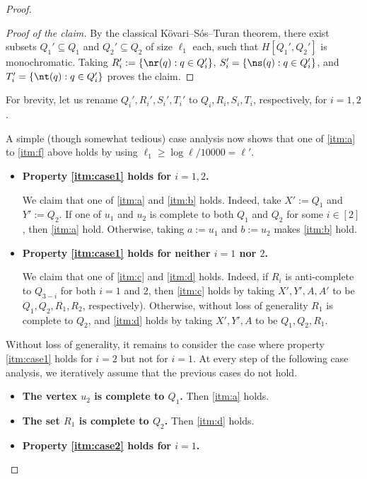 \documentclass[11pt,english]{article}
\theoremstyle{plain}
\theoremstyle{definition}
\theoremstyle{remark}
\begin{document}
\begin{proof}
\begin{proof}[Proof of the claim]
            By the classical K\"ovari--S\'os--Turan theorem, there exist subsets $Q_1' \subseteq Q_1$ and $Q_2' \subseteq Q_2$ of size $\ell_1$ each, such that $H[Q_1', Q_2']$ is monochromatic. Taking $R_i' := \{\nr(q) : q \in Q_i'\}$, $S_i'=\{\ns(q) : q \in Q_i'\}$, and $T_i'=\{\nt(q) : q \in Q_i'\}$ proves the claim.
        \end{proof}
        
        For brevity, let us rename $Q_i', R_i', S_i', T_i'$ to $Q_i, R_i, S_i, T_i$, respectively, for $i=1,2$.
        
        A simple (though somewhat tedious) case analysis now shows that one of \ref{itm:a} to \ref{itm:f} above holds by using $\ell_1 \ge \log \ell / 10000 = \ell'$. 
        \begin{itemize}
            \item
                {\bf Property \ref{itm:case1} holds for $i =1,2$.}
                
                We claim that one of \ref{itm:a} and \ref{itm:b} holds. Indeed, take $X' := Q_1$ and $Y' := Q_2$. If one of $u_1$ and $u_2$ is complete to both $Q_1$ and $Q_2$ for some $i \in [2]$, then \ref{itm:a} hold. Otherwise, taking $a := u_1$ and $b := u_2$ makes \ref{itm:b} hold.
            \item
                {\bf Property \ref{itm:case1} holds for neither $i =1$ nor $2$.}
                
                We claim that one of \ref{itm:c} and \ref{itm:d} holds. 
                Indeed, if $R_i$ is anti-complete to $Q_{3-i}$ for both $i=1$ and $2$, then \ref{itm:c} holds by taking $X', Y', A, A'$ to be $Q_1, Q_2, R_1, R_2$, respectively). Otherwise, without loss of generality $R_1$ is complete to $Q_2$, and \ref{itm:d} holds by taking $X', Y', A$ to be $Q_1, Q_2, R_1$.
        \end{itemize}
        Without loss of generality, it remains to consider the case where property \ref{itm:case1} holds for $i = 2$ but not for $i = 1$.
        At every step of the following case analysis, we iteratively assume that the previous cases do not hold.
        \begin{itemize}
            \item
                {\bf The vertex $u_2$ is complete to $Q_1$.} Then \ref{itm:a} holds.
            \item
                {\bf The set $R_1$ is complete to $Q_2$.} Then \ref{itm:d} holds.
            \item
                {\bf Property \ref{itm:case2} holds for $i = 1$.} 
                

\end{itemize}
\end{proof}
\end{document}
